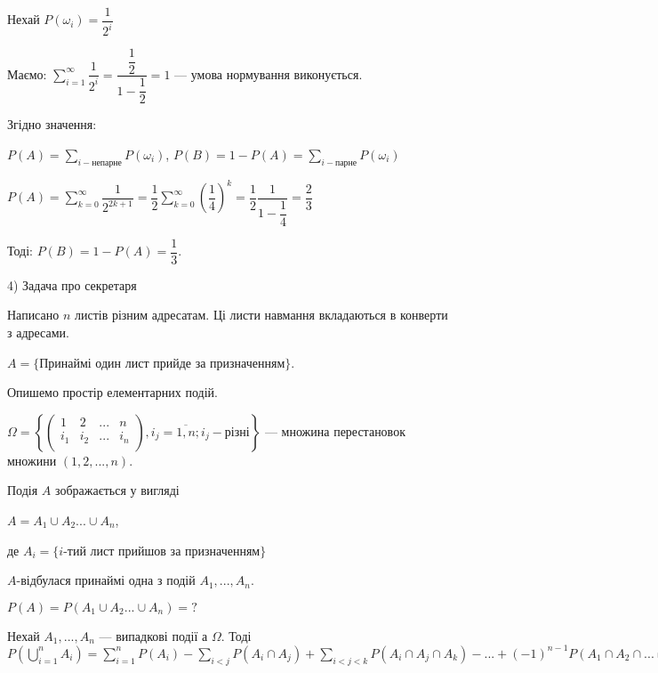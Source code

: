 \begin{example}
    Нехай $P(\omega_i) = \dfrac{1}{2^i}$

    Маємо: $\sum\limits_{i=1}^{\infty} \dfrac{1}{2^i}
    = \dfrac{\dfrac{1}{2}}{1 - \dfrac{1}{2}} = 1$ --- умова
    нормування виконується.

    Згідно значення:

    $P(A) = \sum\limits_{i-\text{непарне}} P(\omega_i)$,
    $P(B) = 1 - P(A) = \sum\limits_{i-\text{парне}} P(\omega_i)$

    $P(A) = \sum\limits_{k=0}^{\infty} \dfrac{1}{2^{2k+1}}
    = \dfrac{1}{2} \sum\limits_{k=0}^{\infty} (\dfrac{1}{4})^k
    = \dfrac{1}{2} \dfrac{1}{1 - \dfrac{1}{4}} = \dfrac{2}{3}$

    Тоді: $P(B) = 1 - P(A) = \dfrac{1}{3}$.

    4) Задача про секретаря

    Написано $n$ листів різним адресатам. Ці листи навмання
    вкладаються в конверти з адресами.

    $A = \{$Принаймі один лист прийде за призначенням$\}$.

    Опишемо простір елементарних подій.

    $\Omega = \left\{ \begin{pmatrix}
        1 & 2 & ... & n \\
        i_1 & i_2 & ... & i_n \\
    \end{pmatrix}, i_j = \overline{1,n}; i_j - \text{різні} \right\}$
    --- множина перестановок множини $(1, 2, ..., n)$.

    Подія $A$ зображається у вигляді
    
    $A = A_1 \cup A_2 ... \cup A_n$,

    де $A_i = \{i$-тий лист прийшов за призначенням$\}$

    $A$-відбулася принаймі одна з подій $A_1, ..., A_n$.

    $P(A) = P(A_1 \cup A_2 ... \cup A_n) = ?$
\end{example}

\begin{lemma}
    Нехай $A_1, ..., A_n$ --- випадкові події а $\Omega$. Тоді
    $P(\bigcup\limits_{i=1}^n A_i)
    = \sum\limits_{i=1}^n P(A_i)
        - \sum\limits_{i<j} P(A_i \cap A_j)
        + \sum\limits_{i<j<k} P(A_i \cap A_j \cap A_k) - ...
        + (-1)^{n-1} P(A_1 \cap A_2 \cap ... \cap A_n)$
\end{lemma}





